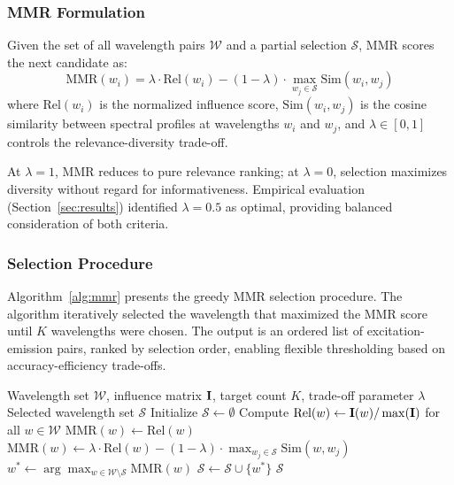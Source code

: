 \subsubsection{MMR Formulation}
Given the set of all wavelength pairs $\mathcal{W}$ and a partial selection $\mathcal{S}$, MMR scores the next candidate as:
\begin{equation}
\text{MMR}(w_i) = \lambda \cdot \text{Rel}(w_i) - (1 - \lambda) \cdot \max_{w_j \in \mathcal{S}} \text{Sim}(w_i, w_j)
\label{eq:mmr}
\end{equation}
where $\text{Rel}(w_i)$ is the normalized influence score, $\text{Sim}(w_i, w_j)$ is the cosine similarity between spectral profiles at wavelengths $w_i$ and $w_j$, and $\lambda \in [0, 1]$ controls the relevance-diversity trade-off.

At $\lambda = 1$, MMR reduces to pure relevance ranking; at $\lambda = 0$, selection maximizes diversity without regard for informativeness.
Empirical evaluation (Section~\ref{sec:results}) identified $\lambda = 0.5$ as optimal, providing balanced consideration of both criteria.

\subsubsection{Selection Procedure}
Algorithm~\ref{alg:mmr} presents the greedy MMR selection procedure.
The algorithm iteratively selected the wavelength that maximized the MMR score until $K$ wavelengths were chosen.
The output is an ordered list of excitation-emission pairs, ranked by selection order, enabling flexible thresholding based on accuracy-efficiency trade-offs.

\begin{algorithm}[t]
\caption{MMR Wavelength Selection}
\label{alg:mmr}
\begin{algorithmic}[1]
\REQUIRE Wavelength set $\mathcal{W}$, influence matrix $\mathbf{I}$, target count $K$, trade-off parameter $\lambda$
\ENSURE Selected wavelength set $\mathcal{S}$
\STATE Initialize $\mathcal{S} \gets \emptyset$
\STATE Compute $\text{Rel}(w) \gets \mathbf{I}(w) / \max(\mathbf{I})$ for all $w \in \mathcal{W}$
            \STATE $\text{MMR}(w) \gets \text{Rel}(w)$
        \ELSE
            \STATE $\text{MMR}(w) \gets \lambda \cdot \text{Rel}(w) - (1-\lambda) \cdot \max_{w_j \in \mathcal{S}} \text{Sim}(w, w_j)$
        \ENDIF
    \ENDFOR
    \STATE $w^* \gets \arg\max_{w \in \mathcal{W} \setminus \mathcal{S}} \text{MMR}(w)$
    \STATE $\mathcal{S} \gets \mathcal{S} \cup \{w^*\}$
\ENDFOR
\RETURN $\mathcal{S}$
\end{algorithmic}
\end{algorithm}

